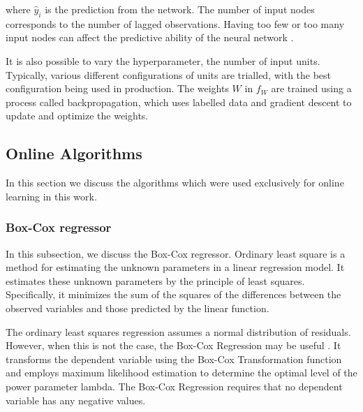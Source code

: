 \documentclass[final,3p,times,twocolumn,numbers]{elsarticle}
\begin{document}
\noindent where $\hat{y}_i$ is the prediction from the network. The number of input nodes corresponds to the number of lagged observations. Having too few or too many input nodes can affect the predictive ability of the neural network \cite{Pao2007}.

It is also possible to vary the hyperparameter, the number of input units. Typically, various different configurations of units are trialled, with the best configuration being used in production. The weights $W$ in $f_W$ are trained using a process called backpropagation, which uses labelled data and gradient descent to update and optimize the weights.

\subsection{Online Algorithms}

In this section we discuss the algorithms which were used exclusively for online learning in this work.

\subsubsection{Box-Cox regressor}

In this subsection, we discuss the Box-Cox regressor. Ordinary least square is a method for estimating the unknown parameters in a linear regression model. It estimates these unknown parameters by the principle of least squares. Specifically, it minimizes the sum of the squares of the differences between the observed variables and those predicted by the linear function.

The ordinary least squares regression assumes a normal distribution of residuals. However, when this is not the case, the Box-Cox Regression may be useful \cite{Box1964}. It transforms the dependent variable using the Box-Cox Transformation function and employs maximum likelihood estimation to determine the optimal level of the power parameter lambda. The Box-Cox Regression requires that no dependent variable has any negative values.


%
%
%
%
\end{document}

